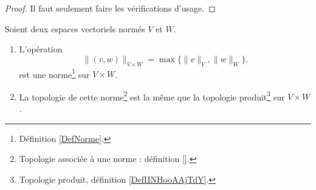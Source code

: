 \begin{proof}
    Il faut seulement faire les vérifications d'usage.
\end{proof}

\begin{lemmaDef}        \label{LEMooFQMSooLmdIvD}
    Soient deux espaces vectoriels normés \( V\) et \( W\). 
    \begin{enumerate}
        \item 
            L'opération
            \begin{equation}	\label{EqNormeVxWmax}
                \|(v,w) \|_{V\times W}=\max\{\|v\|_{V},\|w\|_W\}.
            \end{equation}
            est une norme\footnote{Définition \ref{DefNorme}.} sur \( V\times W\).
        \item
            La topologie de cette norme\footnote{Topologie associée à une norme : définition \ref{}.} est la même que la topologie produit\footnote{Topologie produit, définition \ref{DefIINHooAAjTdY}.} sur \( V\times W\).
    \end{enumerate}
\end{lemmaDef}

